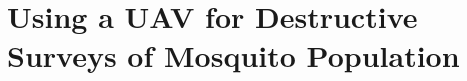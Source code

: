 \chapter[UAV Surveying Mosquitoes]{Using a UAV for Destructive Surveys of Mosquito Population}







%
%
%
%
